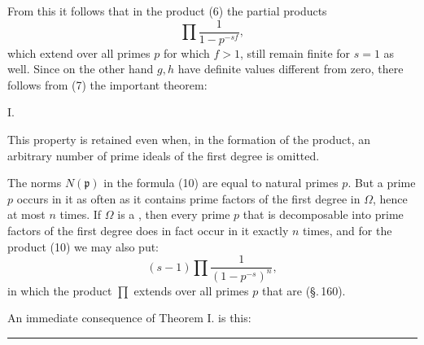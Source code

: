 From this it follows that in the product (6) the partial products
\[
\prod \frac{1}{1-p^{-sf}},
\]
which extend over all primes $p$ for which $f>1$, still remain finite
for $s=1$ as well. Since on the other hand $g, h$ have definite
values different from zero, there follows from (7) the important
theorem:

I. 

This property is retained even when, in the formation of the
product, an arbitrary  number of prime ideals of the first
degree is omitted.

The norms $N(\mathfrak{p})$ in the formula (10) are equal to natural
primes $p$. But a prime $p$ occurs in it as often as it contains
prime factors of the first degree in $\Omega$, hence at most
$n$ times. If $\Omega$ is a , then every prime $p$ that
is decomposable into prime factors of the first degree does in
fact occur in it exactly $n$ times, and for the product (10) we
may also put:
\[
(s-1)\prod\frac{1}{(1-p^{-s})^n},
\]
in which the product $\prod$ extends over all primes $p$ that are
 (\S.\,160).

An immediate consequence of Theorem I. is this:


\begin{center}
\rule{6em}{0.4pt}
\end{center}
